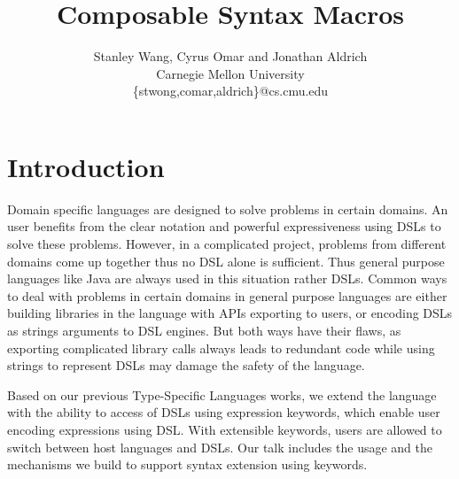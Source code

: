 \documentclass[letterpaper, notitlepage]{article}
\begin{document}
\title{Composable Syntax Macros}
\author{Stanley Wang, Cyrus Omar and Jonathan Aldrich\\
Carnegie Mellon University\\
\{stwong,comar,aldrich\}@cs.cmu.edu}
\date{}
\maketitle

\section{Introduction}
Domain specific languages are designed to solve problems in certain domains. An user benefits from the clear notation and powerful expressiveness using DSLs to solve these problems. However, in a complicated project, problems from different domains come up together thus no DSL alone is sufficient. Thus general purpose languages like Java are always used in this situation rather DSLs. Common ways to deal with problems in certain domains in general purpose languages are either building libraries in the language with APIs exporting to users, or encoding DSLs as strings arguments to DSL engines. But both ways have their flaws, as exporting complicated library calls always leads to redundant code while using strings to represent DSLs may damage the safety of the language.
\par
Based on our previous Type-Specific Languages works, we extend the language with the ability to access of DSLs using expression keywords, which enable user encoding expressions using DSL. With extensible keywords, users are allowed to switch between host languages and DSLs. Our talk includes the usage and the mechanisms we build to support syntax extension using keywords.
\end{document}
